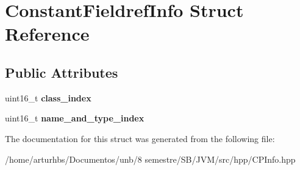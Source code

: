\hypertarget{structConstantFieldrefInfo}{}\section{Constant\+Fieldref\+Info Struct Reference}
\label{structConstantFieldrefInfo}
\subsection*{Public Attributes}
\begin{DoxyCompactItemize}
\item 
uint16\+\_\+t {\bfseries class\+\_\+index}\hypertarget{structConstantFieldrefInfo_a7ea01fdcbde2bcbc719a5c5834936082}{}\label{structConstantFieldrefInfo_a7ea01fdcbde2bcbc719a5c5834936082}

\item 
uint16\+\_\+t {\bfseries name\+\_\+and\+\_\+type\+\_\+index}\hypertarget{structConstantFieldrefInfo_a28acf39ab3393b29ebe328bb37021729}{}\label{structConstantFieldrefInfo_a28acf39ab3393b29ebe328bb37021729}

\end{DoxyCompactItemize}


The documentation for this struct was generated from the following file\+:\begin{DoxyCompactItemize}
\item 
/home/arturhbs/\+Documentos/unb/8 semestre/\+S\+B/\+J\+V\+M/src/hpp/C\+P\+Info.\+hpp\end{DoxyCompactItemize}
